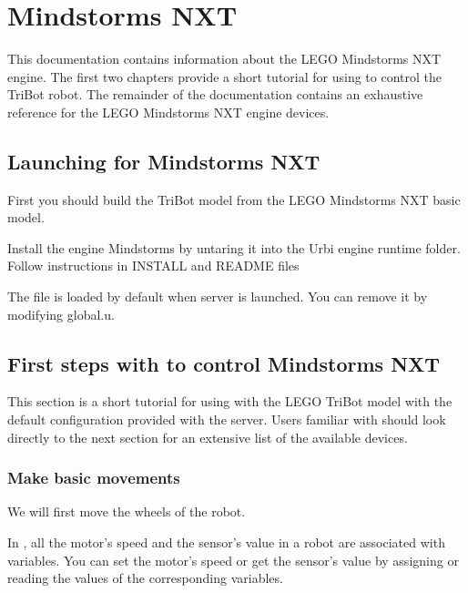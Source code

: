 
\chapter{Mindstorms NXT}
\label{sec:nxt}

This documentation contains information about the LEGO Mindstorms NXT
\urbi engine.  The first two chapters provide a short tutorial for
using \urbi to control the TriBot robot.  The remainder of the
documentation contains an exhaustive reference for the LEGO Mindstorms
NXT \urbi engine devices.

\section{Launching \urbi for Mindstorms NXT}

First you should build the TriBot model from the LEGO Mindstorms NXT basic
model.

Install the engine Mindstorms by untaring it into the Urbi engine runtime
folder. Follow instructions in INSTALL and README files

The file  is loaded by default when server is launched. You
can remove it by modifying global.u.

\section{First steps with \urbi to control Mindstorms NXT}

This section is a short tutorial for using \urbi with the LEGO TriBot model with
the default configuration provided with the \urbi server. Users familiar with
\urbi should look directly to the next section for an extensive list of the
available devices.

\subsection{Make basic movements}

We will first move the wheels of the robot.

In \urbi, all the motor's speed and the sensor's value in a robot are associated
with variables. You can set the motor's speed or get the sensor's value by
assigning or reading the values of the corresponding variables.

